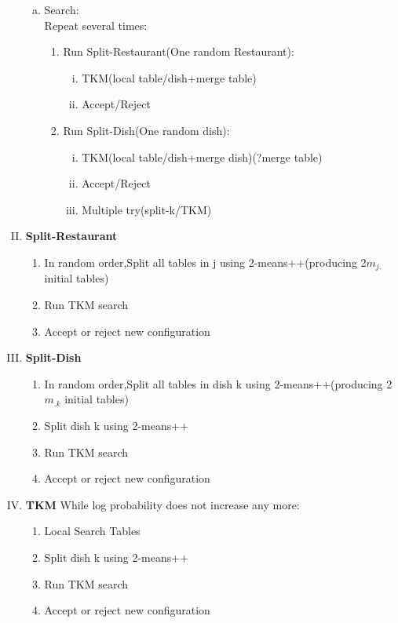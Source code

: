 \documentclass{article}
\begin{document}
\begin{spacing}{1.1}
\begin{enumerate}[(I)]
\begin{enumerate}[(a)]
\item Search:\\
  Repeat several times:
   \begin{enumerate}[(1)]

     \item Run Split-Restaurant(One random Restaurant):
\begin{enumerate}[(i)]
\item TKM(local table/dish+merge table)
\item Accept/Reject
\end{enumerate}
     \item Run Split-Dish(One random dish):
\begin{enumerate}[(i)]
\item TKM(local table/dish+merge dish)(?merge table)
\item Accept/Reject
\item Multiple try(split-k/TKM)
\end{enumerate}
    \end{enumerate}

\end{enumerate}
\item {\bf Split-Restaurant}
\begin{enumerate}[(1)]
\item In random order,Split all tables in j using 2-means++(producing 2$m_{j.}$ initial tables)
\item Run TKM search
\item Accept or reject new configuration
\end{enumerate}

\item {\bf Split-Dish}
\begin{enumerate}[(1)]
\item In random order,Split all tables in dish k using 2-means++(producing 2$m_{.k}$ initial tables) 
\item Split dish k using 2-means++
\item Run TKM search
\item Accept or reject new configuration
\end{enumerate}

\item {\bf TKM}
While log probability does not increase any more:
\begin{enumerate}[(1)]
\item Local Search Tables
\item Split dish k using 2-means++
\item Run TKM search
\item Accept or reject new configuration
\end{enumerate}


\end{enumerate}
\end{spacing}
\end{document}
